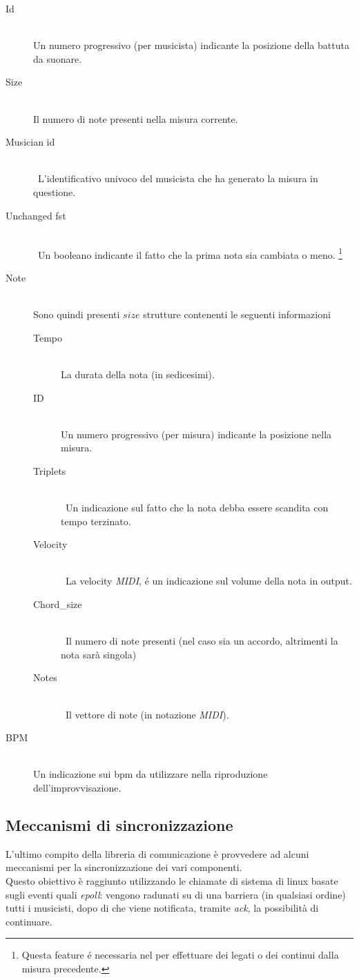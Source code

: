 \begin{description}
\item[Id] \hfill \\
Un numero progressivo (per musicista) indicante la posizione della battuta da suonare.
\item[Size] \hfill \\
Il numero di note presenti nella misura corrente.
\item[Musician id] \hfill \\\
L'identificativo univoco del musicista che ha generato la misura in questione.
\item[Unchanged fst] \hfill \\\
Un booleano indicante il fatto che la prima nota sia cambiata o meno.
\footnote{Questa feature \'e necessaria nel per effettuare dei legati
	  o dei continui dalla misura precedente.}
\item[Note] \hfill \\
Sono quindi presenti $size$ strutture contenenti le seguenti informazioni
\begin{description}
\item[Tempo] \hfill \\
La durata della nota (in sedicesimi).
\item[ID] \hfill \\
Un numero progressivo (per misura) indicante la posizione nella misura.
\item[Triplets] \hfill \\\
Un indicazione sul fatto che la nota debba essere scandita con tempo terzinato.
\item[Velocity] \hfill \\\
La velocity \emph{MIDI}, \'e un indicazione sul volume della nota in output.
\item[Chord\_size] \hfill \\\
Il numero di note presenti (nel caso sia un accordo,
altrimenti la nota sarà singola)
\item[Notes] \hfill \\\
Il vettore di note (in notazione \emph{MIDI}).
\end{description}
\item[BPM] \hfill \\
Un indicazione sui bpm da utilizzare nella riproduzione dell'improvvisazione.
\end{description}

\subsection{Meccanismi di sincronizzazione}
L'ultimo compito della libreria di comunicazione è
provvedere ad alcuni meccanismi per la sincronizzazione dei vari componenti.\\
Questo obiettivo è raggiunto utilizzando le chiamate di sistema di linux basate
sugli eventi quali \emph{epoll}: vengono radunati su di una barriera
(in qualsiasi ordine) tutti i musicisti, dopo di che viene notificata, tramite
\emph{ack}, la possibilità di continuare.
